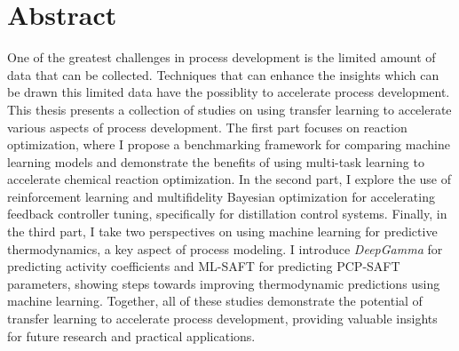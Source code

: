 \begingroup
\let\clearpage\relax
\let\cleardoublepage\relax
\let\cleardoublepage\relax

\chapter*{Abstract}

One of the greatest challenges in process development is the limited amount of data that can be collected. Techniques that can enhance the insights which can be drawn this limited data have the possiblity to accelerate process development. This thesis presents a collection of studies on using transfer learning to accelerate various aspects of process development. The first part focuses on reaction optimization, where I propose a benchmarking framework for comparing machine learning models and demonstrate the benefits of using multi-task learning to accelerate chemical reaction optimization. In the second part, I explore the use of reinforcement learning and multifidelity Bayesian optimization for accelerating feedback controller tuning, specifically for distillation control systems. Finally, in the third part, I take two perspectives on using machine learning for predictive thermodynamics, a key aspect of process modeling. I introduce \textit{DeepGamma} for predicting activity coefficients and ML-SAFT for predicting PCP-SAFT parameters, showing steps towards improving thermodynamic predictions using machine learning. Together, all of these studies demonstrate the potential of transfer learning to accelerate process development, providing valuable insights for future research and practical applications.

\vfill

\endgroup			

\vfill